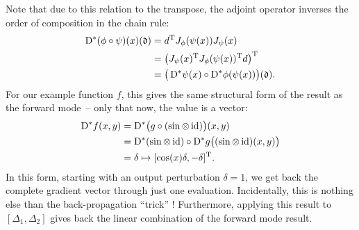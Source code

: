 Note that due to this relation to the transpose, the adjoint operator inverses the order of
composition in the chain rule:
\begin{equation}
  \begin{aligned}
    \mathop{}\!\mathrm{D}^{*} (\phi \circ \psi)(x)(\mathfrak{d}) &= d^{\mathrm{T}} J_{\phi}(\psi(x)) J_{\psi}(x) \\
    &=  \big( J_{\psi}(x)^{\mathrm{T}} J_{\phi}(\psi(x))^{\mathrm{T}} d \big)^{\mathrm{T}} \\
    &= \big( \mathop{}\!\mathrm{D}^{*}\psi(x) \circ \mathop{}\!\mathrm{D}^{*}\phi(\psi(x)) \big)(\mathfrak{d}).
  \end{aligned}
\end{equation}
For our example function \(f\), this gives the same structural form of the result as the forward
mode~-- only that now, the value is a vector:
\begin{equation}
  \begin{aligned}
    \mathop{}\!\mathrm{D}^{*} f(x, y) &= \mathop{}\!\mathrm{D}^{*} \big( g \circ (\sin \otimes \operatorname{id}) \big)(x, y) \\
    &= \mathop{}\!\mathrm{D}^{*}(\sin \otimes \operatorname{id}) \circ \mathop{}\!\mathrm{D}^{*} g \big( (\sin \otimes \operatorname{id})(x, y) \big) \\
    &= \delta \mapsto [\cos(x)\delta, -\delta]^{\mathrm{T}}.
  \end{aligned}
\end{equation}
In this form, starting with an output perturbation \(\delta = 1\), we get back the complete gradient
vector through just one evaluation.  Incidentally, this is nothing else than the back-propagation
\enquote{trick} \parencite{bishop2006pattern}!  Furthermore, applying this result to
\([\Delta_1, \Delta_2]\) gives back the linear combination of the forward mode result.

